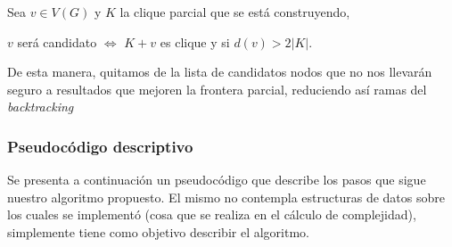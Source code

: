 \begin{description}
        \bigskip
        \par Sea $v \in V(G)$ y $K$ la clique parcial que se est\'a construyendo,
        \par $v$ ser\'a candidato $\iff$ $K+v$ es clique y si $d(v) > 2|K|$.

        \bigskip
        \par De esta manera, quitamos de la lista de candidatos nodos que no nos
            llevar\'an seguro a resultados que mejoren la frontera parcial, reduciendo
            as\'i ramas del \emph{backtracking}
        \label{backtracking:poda:candidatos_que_sumen}

\end{description}

\subsubsection{Pseudoc\'odigo descriptivo}
\par Se presenta a continuaci\'on un pseudoc\'odigo que describe los pasos que sigue
    nuestro algoritmo propuesto. El mismo no contempla estructuras de datos sobre
    los cuales se implement\'o (cosa que se realiza en el c\'alculo de complejidad),
    simplemente tiene como objetivo describir el algoritmo.

